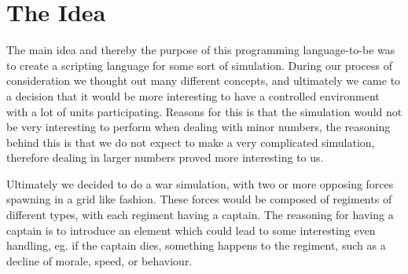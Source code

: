 \section{The Idea}
	The main idea and thereby the purpose of this programming language-to-be 
	was to create a scripting language for some sort of simulation. 
	During our process of consideration we thought out many different concepts, 
	and ultimately we came to a decision that it would be more interesting to 
	have a controlled environment with a lot of units participating. Reasons for 
	this is that the simulation would not be very interesting to perform when dealing with minor numbers, 
	the reasoning behind this is that we do not expect to make a very complicated simulation, therefore dealing in larger numbers proved 
	more interesting to us. \newline
	
	Ultimately we decided to do a war simulation, with two or more opposing forces 
	spawning in a grid like fashion. These forces would be composed of regiments of 
	different types, with each regiment having a captain. The reasoning for having a 
	captain is to introduce an element which could lead to some interesting even handling, 
	eg. if the captain dies, something happens to the regiment, such as a decline of morale, speed, or behaviour.